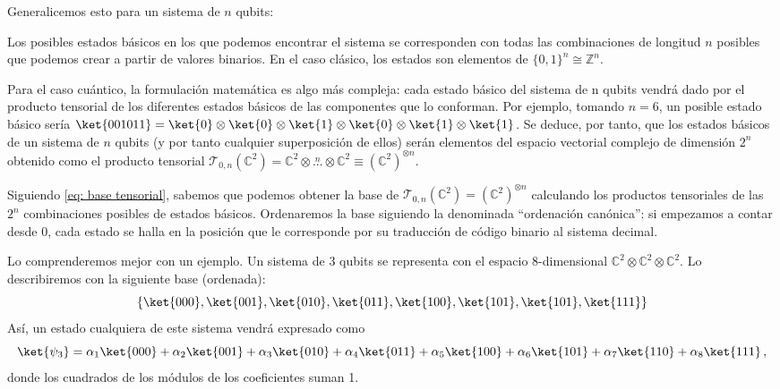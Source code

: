 \documentclass[11pt,a4paper,twoside,pdf]{article}
\numberwithin{equation}{section}
\begin{document}
		Generalicemos esto para un sistema de $n$ qubits:
		
		Los posibles estados básicos en los que podemos encontrar el sistema se corresponden con todas las combinaciones de longitud $n$ posibles que podemos crear a partir de valores binarios. En el caso clásico, los estados son elementos de $\{0,1\}^n \cong \mathbb{Z}^n$. 
		
		Para el caso cuántico, la formulación matemática es algo más compleja: cada estado básico del sistema de n qubits vendrá dado por el producto tensorial de los diferentes estados básicos de las componentes que lo conforman. Por ejemplo, tomando $n=6$, un posible estado básico sería $\ket{001011}=\ket{0} \otimes\ket{0} \otimes\ket{1} \otimes\ket{0} \otimes\ket{1} \otimes\ket{1}$. Se deduce, por tanto, que los estados básicos de un sistema de $n$ qubits (y por tanto cualquier superposición de ellos) serán elementos del espacio vectorial complejo de dimensión $2^n$ obtenido como el producto tensorial $\mathcal{T}_{0,n}(\mathbb{C}^2)=\mathbb{C}^2 \otimes \overset{n}{...} \otimes \mathbb{C}^2 \equiv \left( \mathbb{C}^2\right)^{\otimes n} $.
		
		Siguiendo \eqref{eq: base tensorial}, sabemos que podemos obtener la base de $\mathcal{T}_{0,n}(\mathbb{C}^2)=\left( \mathbb{C}^2\right)^{\otimes n}$ calculando los productos tensoriales de las $2^n$ combinaciones posibles de estados básicos. Ordenaremos la base siguiendo la denominada ``ordenación canónica'': si empezamos a contar desde 0, cada estado se halla en la posición que le corresponde por su traducción de código binario al sistema decimal. 
		
		Lo comprenderemos mejor con un ejemplo.	Un sistema de 3 qubits se representa con el espacio 8-dimensional $\mathbb{C}^2\otimes \mathbb{C}^2 \otimes \mathbb{C}^2$. Lo describiremos con la siguiente base (ordenada):
			\begin{equation} \notag
				\{\ket{000},\ket{001},\ket{010},\ket{011},\ket{100},\ket{101},\ket{101},\ket{111}\}
			\end{equation}
		Así, un estado cualquiera de este sistema vendrá expresado como 
			\begin{equation}  \notag
			\ket{\psi_3} = \alpha_1 \ket{000} + \alpha_2 \ket{001} + \alpha_3 \ket{010} + \alpha_4 \ket{011} + \alpha_5 \ket{100} + \alpha_6 \ket{101} + \alpha_7 \ket{110} + \alpha_8 \ket{111} \, ,
			\end{equation}
		donde los cuadrados de los módulos de los coeficientes suman 1.
		
\end{document}
